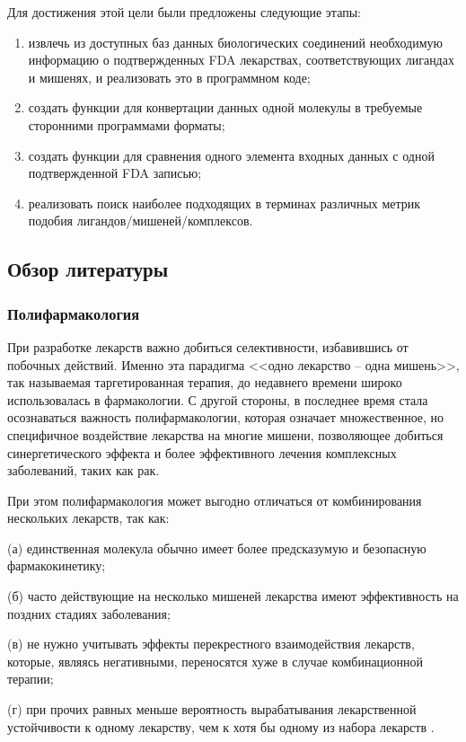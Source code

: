 \documentclass[a4paper,14pt]{article}         %
\begin{document}
Для достижения этой цели были предложены следующие этапы:
\begin{enumerate}
	\item извлечь из доступных баз данных биологических соединений необходимую информацию о подтвержденных FDA лекарствах, соответствующих лигандах и мишенях, и реализовать это в программном коде;
	\item создать функции для конвертации данных одной молекулы в требуемые сторонними программами форматы;
	\item создать функции для сравнения одного элемента входных данных с одной подтвержденной FDA записью;
	\item реализовать поиск наиболее подходящих в терминах различных метрик подобия лигандов/мишеней/комплексов.
\end{enumerate}

\subsection{Обзор литературы}
\subsubsection{Полифармакология}
При разработке лекарств важно добиться селективности, избавившись от побочных действий. Именно эта парадигма <<одно лекарство -- одна мишень>>, так называемая таргетированная терапия, до недавнего времени широко использовалась в фармакологии. С другой стороны, в последнее время стала осознаваться важность полифармакологии, которая означает множественное, но специфичное воздействие лекарства на многие мишени, позволяющее добиться синергетического эффекта и более эффективного лечения комплексных заболеваний, таких как рак\cite{Anighoro2014}. 

При этом полифармакология может выгодно отличаться от комбинирования нескольких лекарств, так как:

(а) единственная молекула обычно имеет более предсказумую и безопасную фармакокинетику; 

(б) часто действующие на несколько мишеней лекарства имеют  эффективность на поздних стадиях заболевания; 

(в) не нужно учитывать эффекты перекрестного взаимодействия лекарств, которые, являясь негативными, переносятся хуже в случае комбинационной терапии; 

(г) при прочих равных меньше вероятность вырабатывания лекарственной устойчивости к одному лекарству, чем к хотя бы одному из набора лекарств \cite{Anighoro2014}.
\end{document}
